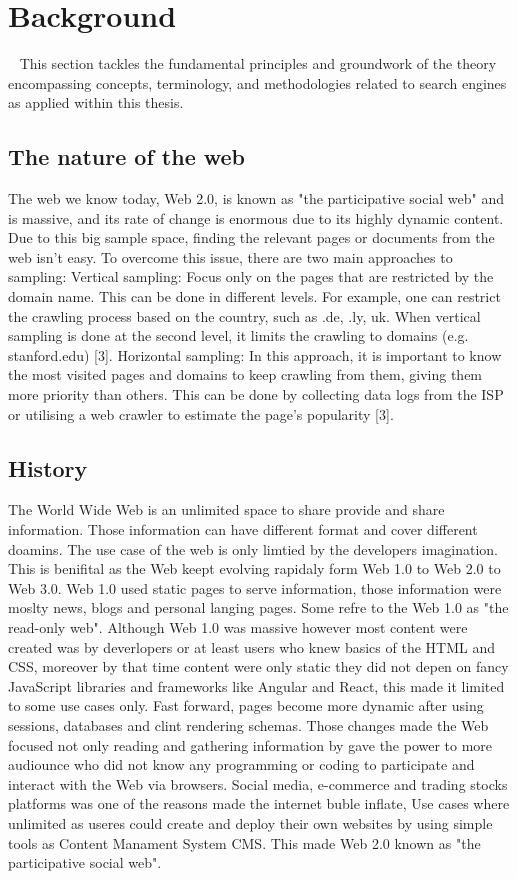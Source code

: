 \chapter{Background}\
\label{chap:background}
This section tackles the fundamental principles and groundwork of the theory encompassing concepts, terminology, and methodologies related to search engines as applied within this thesis.

\section{The nature of the web}
The web we know today, Web 2.0, is known as "the participative social web" and is massive, and its rate of change is enormous due to its highly dynamic content. Due to this big sample space, finding the relevant pages or documents from the web isn't easy. To overcome this issue, there are two main approaches to sampling: 
Vertical sampling: Focus only on the pages that are restricted by the domain name. This can be done in different levels. For example, one can restrict the crawling process based on the country, such as .de, .ly, uk. When vertical sampling is done at the second level, it limits the crawling to domains (e.g. stanford.edu) [3].
Horizontal sampling: In this approach, it is important to know the most visited pages and domains to keep crawling from them, giving them more priority than others. This can be done by collecting data logs from the ISP or utilising a web crawler to estimate the page's popularity [3]. 


\section{History}

The World Wide Web is an unlimited space to share provide and share information. Those information can have different format and cover different doamins. The use case of the web is only limtied by the developers imagination. This is benifital as the Web keept evolving rapidaly form Web 1.0 to Web 2.0 to Web 3.0. Web 1.0 used static pages to serve information, those information were moslty news, blogs and personal langing pages. Some refre to the Web 1.0 as "the read-only web". Although Web 1.0 was massive however most content were created was by deverlopers or at least users who knew basics of the HTML and CSS, moreover by that time content were only static they did not depen on fancy JavaScript libraries and frameworks like Angular and React, this made it limited to some use cases only. Fast forward, pages become more dynamic after using sessions, databases and clint rendering schemas. Those changes made the Web focused not only reading and gathering information by gave the power to more audiounce who did not know any programming or coding to participate and interact with the Web via browsers. Social media, e-commerce and trading stocks platforms was one of the reasons made the internet buble inflate, Use cases where unlimited as useres could create and deploy their own websites by using simple tools as Content Manament System CMS. This made Web 2.0 known as "the participative social web".

